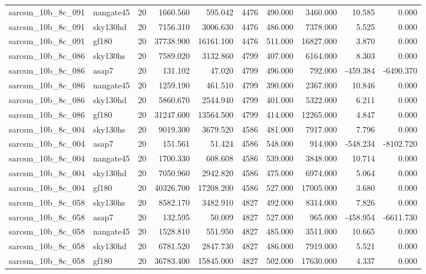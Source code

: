 \documentclass{article}
\begin{document}
\begin{longtable}{llrrrrrrrr}
sarcsm\_10b\_8c\_091 & nangate45 & 20 & 1660.560 & 595.042 & 4476 & 490.000 & 3460.000 & 10.585 & 0.000 \\
sarcsm\_10b\_8c\_091 & sky130hd & 20 & 7156.310 & 3006.630 & 4476 & 486.000 & 7378.000 & 5.525 & 0.000 \\
sarcsm\_10b\_8c\_091 & gf180 & 20 & 37738.900 & 16161.100 & 4476 & 511.000 & 16827.000 & 3.870 & 0.000 \\
sarcsm\_10b\_8c\_086 & sky130hs & 20 & 7589.020 & 3132.860 & 4799 & 407.000 & 6164.000 & 8.303 & 0.000 \\
sarcsm\_10b\_8c\_086 & asap7 & 20 & 131.102 & 47.020 & 4799 & 496.000 & 792.000 & -459.384 & -6490.370 \\
sarcsm\_10b\_8c\_086 & nangate45 & 20 & 1259.190 & 461.510 & 4799 & 390.000 & 2367.000 & 10.846 & 0.000 \\
sarcsm\_10b\_8c\_086 & sky130hd & 20 & 5860.670 & 2544.940 & 4799 & 401.000 & 5322.000 & 6.211 & 0.000 \\
sarcsm\_10b\_8c\_086 & gf180 & 20 & 31247.600 & 13564.500 & 4799 & 414.000 & 12265.000 & 4.847 & 0.000 \\
sarcsm\_10b\_8c\_004 & sky130hs & 20 & 9019.300 & 3679.520 & 4586 & 481.000 & 7917.000 & 7.796 & 0.000 \\
sarcsm\_10b\_8c\_004 & asap7 & 20 & 151.561 & 51.424 & 4586 & 548.000 & 914.000 & -548.234 & -8102.720 \\
sarcsm\_10b\_8c\_004 & nangate45 & 20 & 1700.330 & 608.608 & 4586 & 539.000 & 3848.000 & 10.714 & 0.000 \\
sarcsm\_10b\_8c\_004 & sky130hd & 20 & 7050.960 & 2942.820 & 4586 & 475.000 & 6974.000 & 5.064 & 0.000 \\
sarcsm\_10b\_8c\_004 & gf180 & 20 & 40326.700 & 17208.200 & 4586 & 527.000 & 17005.000 & 3.680 & 0.000 \\
sarcsm\_10b\_8c\_058 & sky130hs & 20 & 8582.170 & 3482.910 & 4827 & 492.000 & 8314.000 & 7.826 & 0.000 \\
sarcsm\_10b\_8c\_058 & asap7 & 20 & 132.595 & 50.009 & 4827 & 527.000 & 965.000 & -458.954 & -6611.730 \\
sarcsm\_10b\_8c\_058 & nangate45 & 20 & 1528.810 & 551.950 & 4827 & 485.000 & 3511.000 & 10.665 & 0.000 \\
sarcsm\_10b\_8c\_058 & sky130hd & 20 & 6781.520 & 2847.730 & 4827 & 486.000 & 7919.000 & 5.521 & 0.000 \\
sarcsm\_10b\_8c\_058 & gf180 & 20 & 36783.400 & 15845.000 & 4827 & 502.000 & 17630.000 & 4.337 & 0.000 \\

\end{longtable}
\end{document}
